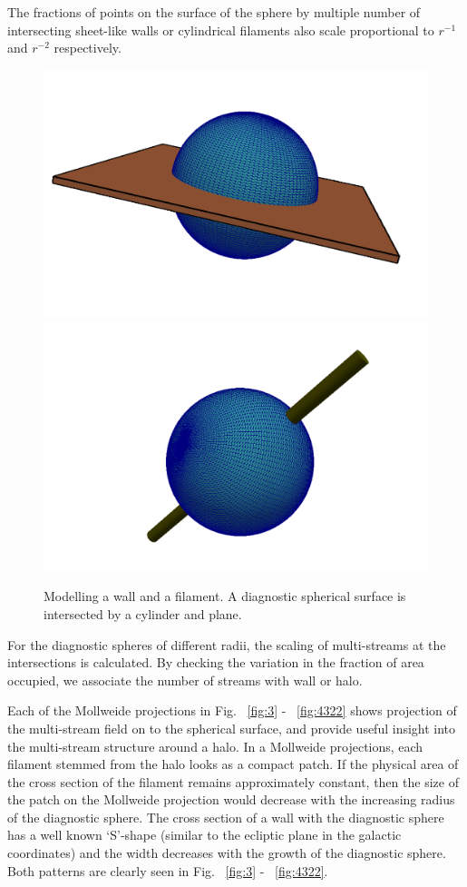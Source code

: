 The fractions of points on the surface of the sphere by multiple number of intersecting sheet-like walls or cylindrical filaments also scale proportional to $ r^{-1}$ and $ r^{-2}$ respectively. 

\begin{figure}
\begin{minipage}[t]{.99\linewidth}
 \centering\includegraphics[width=10.cm]{Chapter3/Source_v2/fig6a} 
  \centering\includegraphics[width=10.cm]{Chapter3/Source_v2/fig6b}
\end{minipage}\hfill
\caption{Modelling a wall and a filament. A diagnostic spherical surface is intersected by a cylinder and plane.}
\label{fig:model}
\end{figure}


For the diagnostic spheres of different radii, the  scaling of multi-streams at the intersections is calculated. By checking the 
variation in the fraction of area occupied, we associate the number of streams with wall or halo. 

Each of the Mollweide projections in Fig. ~\ref{fig:3} - ~\ref{fig:4322} shows projection of the multi-stream field on to the 
spherical surface, and provide useful insight into the multi-stream structure around a halo. %
In a Mollweide projections, each filament stemmed from the halo looks as a compact patch. If the physical area of the cross 
section of the filament remains approximately constant, then the size of the patch on the Mollweide projection would decrease with the increasing radius of the diagnostic sphere. The cross section of a wall with the diagnostic sphere has a well known
`S'-shape (similar to the ecliptic plane in the galactic coordinates) and the width decreases with the growth of the diagnostic sphere. Both patterns are clearly seen in  Fig. ~\ref{fig:3} - ~\ref{fig:4322}.


